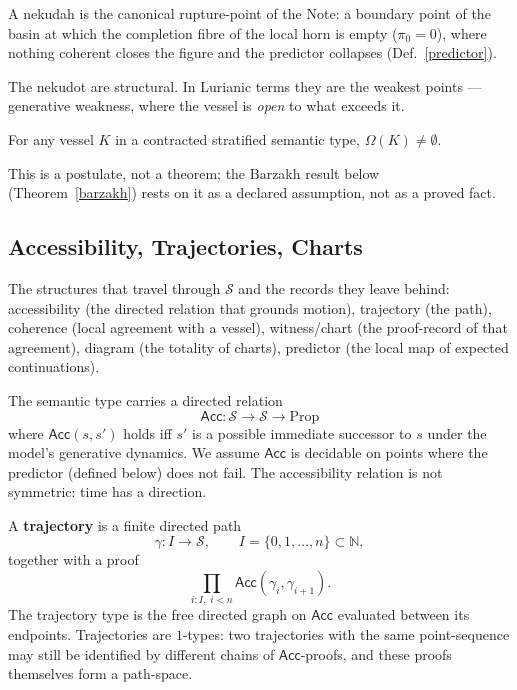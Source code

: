 A nekudah is the canonical rupture-point of the Note: a boundary point of the basin at which the completion fibre of the local horn is empty ($\pi_0 = 0$), where nothing coherent closes the figure and the predictor collapses (Def.~\ref{predictor}).

The nekudot are structural. In Lurianic terms they are the weakest points — generative weakness, where the vessel is \emph{open} to what exceeds it.

\begin{postulate}\label{no-closed-vessel}
For any vessel $K$ in a contracted stratified semantic type, $\Omega(K) \neq \emptyset$.
\end{postulate}

This is a postulate, not a theorem; the Barzakh result below (Theorem~\ref{barzakh}) rests on it as a declared assumption, not as a proved fact.

\subsection{Accessibility, Trajectories, Charts}
\label{subsec:traj}

The structures that travel through $\mathcal{S}$ and the records they leave behind: accessibility (the directed relation that grounds motion), trajectory (the path), coherence (local agreement with a vessel), witness/chart (the proof-record of that agreement), diagram (the totality of charts), predictor (the local map of expected continuations).

\begin{definition}[Accessibility]\label{accessibility}
The semantic type carries a directed relation
\[
\mathsf{Acc} : \mathcal{S} \to \mathcal{S} \to \mathrm{Prop}
\]
where $\mathsf{Acc}(s, s')$ holds iff $s'$ is a possible immediate successor to $s$ under the model's generative dynamics. We assume $\mathsf{Acc}$ is decidable on points where the predictor (defined below) does not fail. The accessibility relation is not symmetric: time has a direction.
\end{definition}

\begin{definition}[Trajectory]\label{trajectory}
A \textbf{trajectory} is a finite directed path
\[
\gamma : I \to \mathcal{S}, \qquad I = \{0, 1, \ldots, n\} \subset \mathbb{N},
\]
together with a proof
\[
\prod_{i : I,\; i < n} \mathsf{Acc}(\gamma_i, \gamma_{i+1}).
\]
The trajectory type is the free directed graph on $\mathsf{Acc}$ evaluated between its endpoints. Trajectories are $1$-types: two trajectories with the same point-sequence may still be identified by different chains of $\mathsf{Acc}$-proofs, and these proofs themselves form a path-space.
\end{definition}

